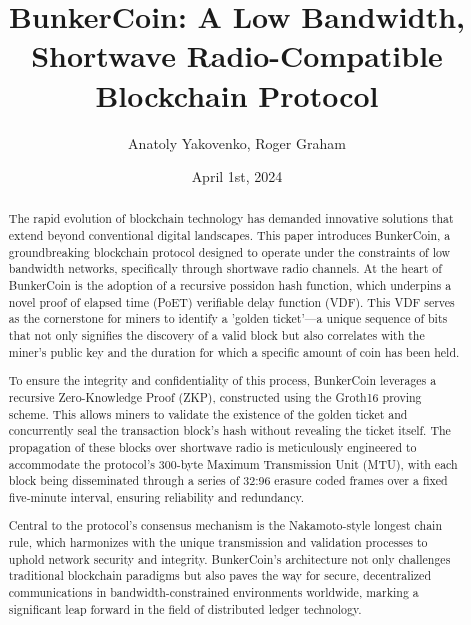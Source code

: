 \documentclass{article}
\title{BunkerCoin: A Low Bandwidth, Shortwave Radio-Compatible Blockchain Protocol}
\author{Anatoly Yakovenko, Roger Graham}
\date{April 1st, 2024}
\begin{document}
\maketitle

\begin{abstract}
The rapid evolution of blockchain technology has demanded innovative solutions that extend beyond conventional digital landscapes. This paper introduces BunkerCoin, a groundbreaking blockchain protocol designed to operate under the constraints of low bandwidth networks, specifically through shortwave radio channels. At the heart of BunkerCoin is the adoption of a recursive possidon hash function, which underpins a novel proof of elapsed time (PoET) verifiable delay function (VDF). This VDF serves as the cornerstone for miners to identify a 'golden ticket'—a unique sequence of bits that not only signifies the discovery of a valid block but also correlates with the miner's public key and the duration for which a specific amount of coin has been held.

To ensure the integrity and confidentiality of this process, BunkerCoin leverages a recursive Zero-Knowledge Proof (ZKP), constructed using the Groth16 proving scheme. This allows miners to validate the existence of the golden ticket and concurrently seal the transaction block's hash without revealing the ticket itself. The propagation of these blocks over shortwave radio is meticulously engineered to accommodate the protocol's 300-byte Maximum Transmission Unit (MTU), with each block being disseminated through a series of 32:96 erasure coded frames over a fixed five-minute interval, ensuring reliability and redundancy.

Central to the protocol's consensus mechanism is the Nakamoto-style longest chain rule, which harmonizes with the unique transmission and validation processes to uphold network security and integrity. BunkerCoin's architecture not only challenges traditional blockchain paradigms but also paves the way for secure, decentralized communications in bandwidth-constrained environments worldwide, marking a significant leap forward in the field of distributed ledger technology.
\end{abstract}
\end{document}
